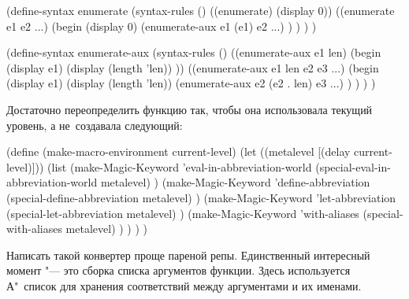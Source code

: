 \begin{code:lisp}
(define-syntax enumerate
  (syntax-rules ()
    ((enumerate) (display 0))
    ((enumerate e1 e2 ...)
     (begin (display 0)
            (enumerate-aux e1 (e1) e2 ...) ) ) ) )

(define-syntax enumerate-aux
  (syntax-rules ()
    ((enumerate-aux e1 len) (begin (display e1)
                                   (display (length 'len)) ))
    ((enumerate-aux e1 len e2 e3 ...)
     (begin (display e1)
            (display (length 'len))
            (enumerate-aux e2 (e2 . len) e3 ...) ) ) ) )
\end{code:lisp}



Достаточно переопределить функцию  так, чтобы она
использовала текущий уровень, а не~создавала следующий:

\begin{code:lisp}
(define (make-macro-environment current-level)
  (let ((metalevel [(delay current-level)]))
    (list (make-Magic-Keyword 'eval-in-abbreviation-world
           (special-eval-in-abbreviation-world metalevel) )
          (make-Magic-Keyword 'define-abbreviation
           (special-define-abbreviation metalevel) )
          (make-Magic-Keyword 'let-abbreviation
           (special-let-abbreviation metalevel) )
          (make-Magic-Keyword 'with-aliases
           (special-with-aliases metalevel) ) ) ) )
\end{code:lisp}



Написать такой конвертер проще пареной репы. Единственный интересный момент "---
это сборка списка аргументов функции. Здесь используется А"~список для хранения
соответствий между аргументами и их именами.

